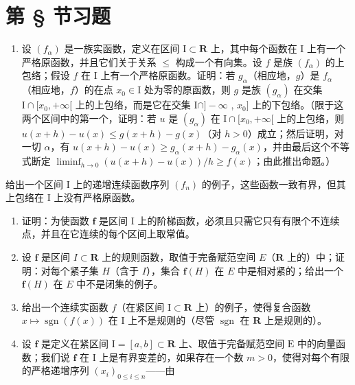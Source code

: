 \section*{第 \S{} 节习题}
{}

\begin{enumerate}
\def\labelenumi{\arabic{enumi})}
\tightlist
\item
  设 \((f_{\alpha})\) 是一族实函数，定义在区间 \(\mathrm{I} \subset \mathbf{R}\) 上，其中每个函数在 \(\mathrm{I}\) 上有一个严格原函数，并且它们关于关系 \(\leqslant\) 构成一个有向集。设 \(f\) 是族 \((f_{\alpha})\) 的上包络；假设 \(f\) 在 \(\mathrm{I}\) 上有一个严格原函数。证明：若 \(g_{\alpha}\)（相应地，\(g\)）是 \(f_{\alpha}\)（相应地，\(f\)）的在点 \(x_0 \in \mathrm{I}\) 处为零的原函数，则 \(g\) 是族 \((g_{\alpha})\) 在交集 \(\mathrm{I} \cap [x_0, +\infty[\) 上的上包络，而是它在交集 \(\mathrm{I} \cap ] - \infty\) , \(x_0]\) 上的下包络。（限于这两个区间中的第一个，证明：若 \(u\) 是 \((g_{\alpha})\) 在 \(\mathrm{I} \cap [x_0, +\infty[\) 上的上包络，则 \(u(x + h) - u(x) \leqslant g(x + h) - g(x)\)（对 \(h > 0\)）成立；然后证明，对一切 \(\alpha\)，有 \(u(x + h) - u(x) \geqslant g_{\alpha}(x + h) - g_{\alpha}(x)\)，并由最后这个不等式断定 \(\liminf_{h \to 0} (u(x + h) - u(x))/h \geqslant f(x)\)；由此推出命题。）
\end{enumerate}

给出一个区间 I 上的递增连续函数序列 \((f_n)\) 的例子，这些函数一致有界，但其上包络在 I 上没有严格原函数。

\begin{enumerate}
\def\labelenumi{\arabic{enumi})}
\setcounter{enumi}{1}
\item
  证明：为使函数 \(\mathbf{f}\) 是区间 I 上的阶梯函数，必须且只需它只有有限个不连续点，并且在它连续的每个区间上取常值。
\item
  设 \(\mathbf{f}\) 是区间 \(I \subset \mathbf{R}\) 上的规则函数，取值于完备赋范空间 \(E\)（\(\mathbf{R}\) 上的）中；证明：对每个紧子集 \(H\)（含于 \(I\)），集合 \(\mathbf{f}(H)\) 在 \(E\) 中是相对紧的；给出一个 \(\mathbf{f}(H)\) 在 \(E\) 中不是闭集的例子。
\item
  给出一个连续实函数 \(f\)（在紧区间 \(\mathrm{I} \subset \mathbf{R}\) 上）的例子，使得复合函数 \(x \mapsto \operatorname{sgn}(f(x))\) 在 \(\mathrm{I}\) 上不是规则的（尽管 \(\operatorname{sgn}\) 在 \(\mathbf{R}\) 上是规则的）。
\item
  设 \(\mathbf{f}\) 是定义在紧区间 \(\mathrm{I} = [a, b] \subset \mathbf{R}\) 上、取值于完备赋范空间 \(\mathrm{E}\) 中的向量函数；我们说 \(\mathbf{f}\) 在 \(\mathrm{I}\) 上是有界变差的，如果存在一个数 \(m > 0\)，使得对每个有限的严格递增序列 \((x_i)_{0 \leqslant i \leqslant n}\)——由
\end{enumerate}

